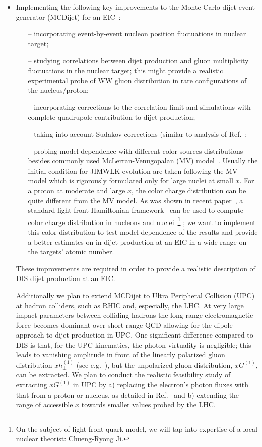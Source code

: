 \begin{itemize}
			\item 
				Implementing the following key improvements to the Monte-Carlo dijet event generator (MCDijet) 
				for an EIC~\cite{TODO}:
				\begin{itemize}
					\item[--] incorporating event-by-event nucleon position fluctuations in nuclear target; 
					\item[--] studying correlations between dijet production and gluon multiplicity fluctuations 
						in the nuclear target; this might provide a realistic experimental probe 
						of WW gluon distribution in rare configurations of the nucleus/proton;
					\item[--] incorporating corrections to the correlation limit and simulations with complete 
						quad\-rupole contribution to dijet production; 
					\item[--] taking into account Sudakov corrections (similar to analysis of Ref.~\cite{Zheng:2014vka};  
					\item[--] probing model dependence with different color sources distributions 
						besides commonly used McLerran-Venugopalan (MV) model~\cite{McLerran:1993ni}. 
						Usually the initial condition for JIM\-WLK evolution are taken following 
						the MV model which is rigorously formulated only for large nuclei at 
						small $x$. For a proton at moderate and large $x$, the color charge 
						distribution can be quite different from the MV model. 
						As was shown in recent paper~\cite{Dumitru:2018vpr}, a
						standard light front Hamiltonian framework~\cite{Brodsky:1997de} can be used to compute color charge 
						distribution in nucleons and nuclei~\footnote{On the subject of light front quark model, 
							we will tap into expertise of a local nuclear theorist: Chueng-Ryong Ji.}  		
							; we want to implement this color distribution 
						to test model dependence of the results and provide a better estimates on 
						in dijet production at an EIC in a wide range on the targets' atomic number.    
				\end{itemize}
				These improvements are required in order to provide a realistic description of DIS
				dijet production at an EIC. 

				Additionally we plan to extend MCDijet to Ultra Peripheral Collision  (UPC) at hadron 
				colliders, such as RHIC and, especially, the LHC. 
				At very large impact-parameters between colliding hadrons the long range electromagnetic
				force becomes dominant over short-range QCD allowing for the dipole approach to 
				dijet production in UPC. One significant difference compared to DIS is that, for
				the UPC kinematics, the photon virtuality  is negligible; 
				this leads to vanishing amplitude in front of the linearly polarized gluon 
				distribution $x h^{(1)}_\perp$ (see e.g.~\cite{Dominguez:2011br}), 
				but the unpolarized gluon distribution, $xG^{(1)}$,  can be extracted. 
				We plan to conduct the realistic feasibility study of extracting  $xG^{(1)}$ in UPC 
				by 
				a) replacing the electron's photon fluxes with that from a proton or nucleus, as detailed in 
				Ref.~\cite{Klein:1999gv}
				and b) extending the range of accessible $x$ towards smaller values probed by  the LHC. 


\end{itemize}
